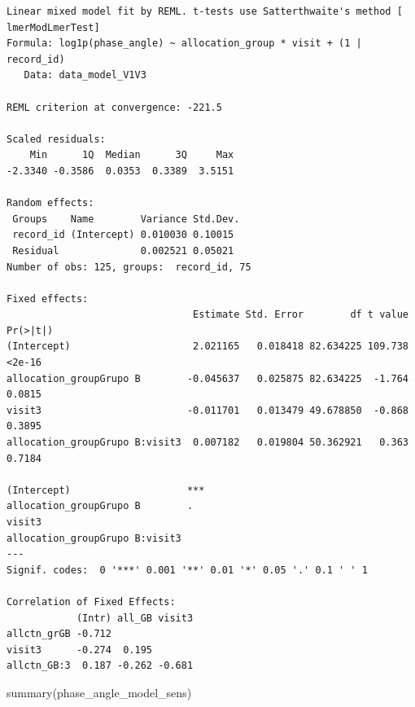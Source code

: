 \documentclass[
  letterpaper,
  DIV=11,
  numbers=noendperiod]{scrartcl}
\newenvironment{Shaded}{\begin{snugshade}}{\end{snugshade}}
\newcommand{\FunctionTok}[1]{\textcolor[rgb]{0.28,0.35,0.67}{#1}}
\newcommand{\NormalTok}[1]{\textcolor[rgb]{0.00,0.23,0.31}{#1}}
\begin{document}
\begin{verbatim}
Linear mixed model fit by REML. t-tests use Satterthwaite's method [
lmerModLmerTest]
Formula: log1p(phase_angle) ~ allocation_group * visit + (1 | record_id)
   Data: data_model_V1V3

REML criterion at convergence: -221.5

Scaled residuals: 
    Min      1Q  Median      3Q     Max 
-2.3340 -0.3586  0.0353  0.3389  3.5151 

Random effects:
 Groups    Name        Variance Std.Dev.
 record_id (Intercept) 0.010030 0.10015 
 Residual              0.002521 0.05021 
Number of obs: 125, groups:  record_id, 75

Fixed effects:
                                Estimate Std. Error        df t value Pr(>|t|)
(Intercept)                     2.021165   0.018418 82.634225 109.738   <2e-16
allocation_groupGrupo B        -0.045637   0.025875 82.634225  -1.764   0.0815
visit3                         -0.011701   0.013479 49.678850  -0.868   0.3895
allocation_groupGrupo B:visit3  0.007182   0.019804 50.362921   0.363   0.7184
                                  
(Intercept)                    ***
allocation_groupGrupo B        .  
visit3                            
allocation_groupGrupo B:visit3    
---
Signif. codes:  0 '***' 0.001 '**' 0.01 '*' 0.05 '.' 0.1 ' ' 1

Correlation of Fixed Effects:
            (Intr) all_GB visit3
allctn_grGB -0.712              
visit3      -0.274  0.195       
allctn_GB:3  0.187 -0.262 -0.681
\end{verbatim}

\begin{Shaded}
\begin{Highlighting}[]
\FunctionTok{summary}\NormalTok{(phase\_angle\_model\_sens)}
\end{Highlighting}
\end{Shaded}
\end{document}
